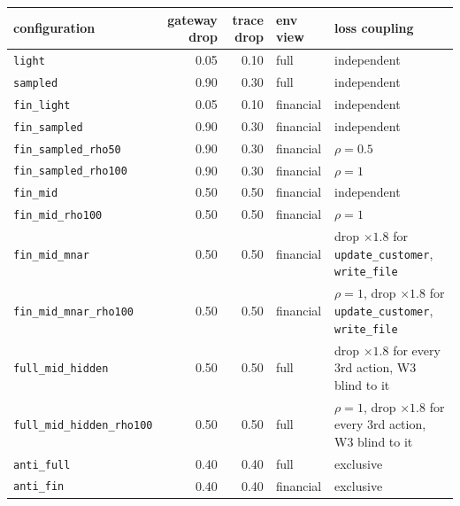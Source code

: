 \begin{tabular}{lrrlp{5.2cm}}
\toprule
configuration & gateway drop & trace drop & env view & loss coupling \\
\midrule
\texttt{light} & 0.05 & 0.10 & full & independent \\
\texttt{sampled} & 0.90 & 0.30 & full & independent \\
\texttt{fin\_light} & 0.05 & 0.10 & financial & independent \\
\texttt{fin\_sampled} & 0.90 & 0.30 & financial & independent \\
\texttt{fin\_sampled\_rho50} & 0.90 & 0.30 & financial & $\rho = 0.5$ \\
\texttt{fin\_sampled\_rho100} & 0.90 & 0.30 & financial & $\rho = 1$ \\
\texttt{fin\_mid} & 0.50 & 0.50 & financial & independent \\
\texttt{fin\_mid\_rho100} & 0.50 & 0.50 & financial & $\rho = 1$ \\
\texttt{fin\_mid\_mnar} & 0.50 & 0.50 & financial & drop $\times1.8$ for \texttt{update\_customer}, \texttt{write\_file} \\
\texttt{fin\_mid\_mnar\_rho100} & 0.50 & 0.50 & financial & $\rho = 1$, drop $\times1.8$ for \texttt{update\_customer}, \texttt{write\_file} \\
\texttt{full\_mid\_hidden} & 0.50 & 0.50 & full & drop $\times1.8$ for every 3rd action, W3 blind to it \\
\texttt{full\_mid\_hidden\_rho100} & 0.50 & 0.50 & full & $\rho = 1$, drop $\times1.8$ for every 3rd action, W3 blind to it \\
\texttt{anti\_full} & 0.40 & 0.40 & full & exclusive \\
\texttt{anti\_fin} & 0.40 & 0.40 & financial & exclusive \\
\bottomrule
\end{tabular}
\par{}
